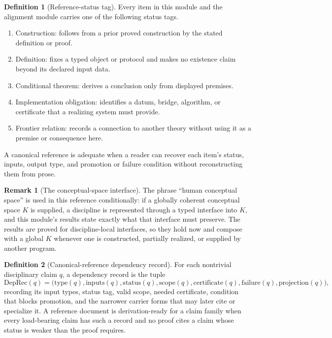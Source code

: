 \documentclass[11pt]{article}
\theoremstyle{definition}
\newtheorem{definition}{Definition}
\newtheorem{remark}{Remark}
\begin{document}
\begin{definition}[Reference-status tag]
Every item in this module and the alignment module carries one of the following status tags.
\begin{enumerate}[label=(T\arabic*)]
\item[(T1)] Construction: follows from a prior proved construction by the stated definition or proof.
\item[(T2)] Definition: fixes a typed object or protocol and makes no existence claim beyond its declared input data.
\item[(T3)] Conditional theorem: derives a conclusion only from displayed premises.
\item[(T4)] Implementation obligation: identifies a datum, bridge, algorithm, or certificate that a realizing system must provide.
\item[(T5)] Frontier relation: records a connection to another theory without using it as a premise or consequence here.
\end{enumerate}
A canonical reference is adequate when a reader can recover each item's status, inputs, output type, and promotion or failure condition without reconstructing them from prose.
\end{definition}

\begin{remark}[The conceptual-space interface]
The phrase ``human conceptual space'' is used in this reference conditionally: if a globally coherent conceptual space $K$ is supplied, a discipline is represented through a typed interface into $K$, and this module's results state exactly what that interface must preserve. The results are proved for discipline-local interfaces, so they hold now and compose with a global $K$ whenever one is constructed, partially realized, or supplied by another program.
\end{remark}

\begin{definition}[Canonical-reference dependency record]
For each nontrivial disciplinary claim $q$, a dependency record is the tuple
\begin{equation}
\mathrm{DepRec}(q) = \big(\mathrm{type}(q), \mathrm{inputs}(q), \mathrm{status}(q), \mathrm{scope}(q), \mathrm{certificate}(q), \mathrm{failure}(q), \mathrm{projection}(q)\big), \tag{S39}
\end{equation}
recording its input types, status tag, valid scope, needed certificate, condition that blocks promotion, and the narrower carrier forms that may later cite or specialize it. A reference document is derivation-ready for a claim family when every load-bearing claim has such a record and no proof cites a claim whose status is weaker than the proof requires.
\end{definition}
\end{document}
